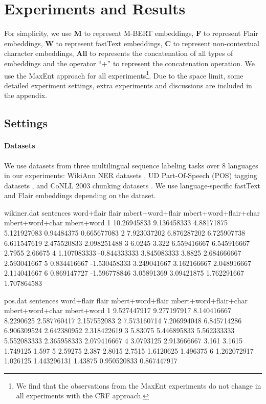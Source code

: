 \documentclass[11pt,a4paper]{article}
\begin{document}
\section{Experiments and Results}
For simplicity, we use \textbf{M} to represent M-BERT embeddings, \textbf{F} to represent Flair embeddings, \textbf{W} to represent fastText embeddings, \textbf{C} to represent non-contextual character embeddings, \textbf{All} to represents the concatenation of all types of embeddings and the operator ``+'' to represent the concatenation operation. We use the MaxEnt approach for all experiments\footnote{We find that the observations from the MaxEnt experiments do not change in all experiments with the CRF approach.}. Due to the space limit, some detailed experiment settings, extra experiments and discussions are included in the appendix. 

\subsection{Settings}
\paragraph{Datasets}
We use datasets from three multilingual sequence labeling tasks over 8 languages in our experiments: WikiAnn NER datasets \cite{pan-etal-2017-cross}, UD Part-Of-Speech (POS) tagging datasets \cite{nivre-etal-2016-universal}, and CoNLL 2003 chunking datasets \cite{tjong-kim-sang-de-meulder-2003-introduction}. We use language-specific fastText and Flair embeddings depending on the dataset. 





\begin{filecontents}{wikiner.dat}
sentences word+flair flair mbert+word+flair mbert+word+flair+char mbert+word+char mbert+word
1 10.26945833 9.136458333 4.88171875 5.121927083 0.94484375 0.665677083
2 7.923037202 6.876287202 6.725907738 6.611547619 2.475520833 2.098251488
3 6.0245 3.322 6.559416667 6.545916667 2.7955 2.66675
4 1.107083333 -0.844333333 3.845083333 3.8825 2.684666667 2.593041667
5 0.834416667 -1.530458333 3.249041667 3.162166667 2.048916667 2.114041667
6 0.869147727 -1.596778846 3.05891369 3.09421875 1.762291667 1.707864583
\end{filecontents}

\begin{filecontents}{pos.dat}
sentences word+flair flair mbert+word+flair mbert+word+flair+char mbert+word+char mbert+word
1 9.527447917 9.277197917 8.140416667 8.2290625 2.587760417 2.157552083
2 7.573160714 7.206994048 6.845714286 6.906309524 2.642380952 2.318422619
3 5.83075 5.446895833 5.562333333 5.552083333 2.365958333 2.079416667
4 3.0793125 2.913666667 3.161 3.1615 1.749125 1.597
5 2.59275 2.387 2.8015 2.7515 1.6120625 1.496375
6 1.262072917 1.026125 1.443296131 1.43875 0.950520833 0.867447917
\end{filecontents}
\end{document}
